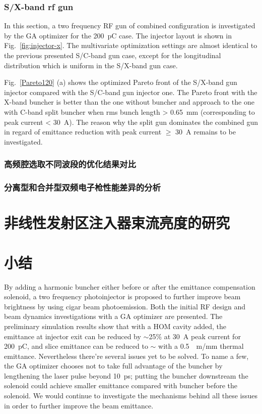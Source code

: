 \subsubsection{S/X-band rf gun}
In this section, a two frequency RF gun of combined configuration is investigated by the GA optimizer for the \SI{200}{pC} case. The injector layout is shown in Fig.~\ref{fig:injector-x}. The multivariate optimization settings are almost identical to the previous presented S/C-band gun case, except for the longitudinal distribution which is uniform in the S/X-band gun case.

Fig.~\ref{Pareto120} (a) shows the optimized Pareto front of the S/X-band gun injector compared with the S/C-band gun injector one. The Pareto front with the X-band buncher is better than the one without buncher and approach to the one with C-band split buncher when rms bunch length > \SI{0.65}{mm} (corresponding to peak current < \SI{30}{A}). The reason why the split gun dominates the combined gun in regard of emittance reduction with peak current $\ge$ \SI{30}{A} remains to be investigated.

\subsubsection{高频腔选取不同波段的优化结果对比}

\subsubsection{分离型和合并型双频电子枪性能差异的分析}

\section{非线性发射区注入器束流亮度的研究}

\section{小结}
By adding a harmonic buncher either before or after the emittance compensation solenoid, a two frequency photoinjector is proposed to further improve beam brightness by using cigar beam photoemission. Both the initial RF design and beam dynamics investigations with a GA optimizer are presented. The preliminary simulation results show that with a HOM cavity added, the emittance at injector exit can be reduced by $\sim$25\% at \SI{30}{A} peak current for \SI{200}{pC}, and slice emittance can be reduced to $\sim$ with a  \SI{0.5}{\mu m/mm} thermal emittance. Nevertheless there're several issues yet to be solved. To name a few, the GA optimizer chooses not to take full advantage of the buncher by lengthening the laser pulse beyond \SI{10}{ps}; putting the buncher downstream the solenoid could achieve smaller emittance compared with buncher before the solenoid. We would continue to investigate the mechanisms behind all these issues in order to further improve the beam emittance.
